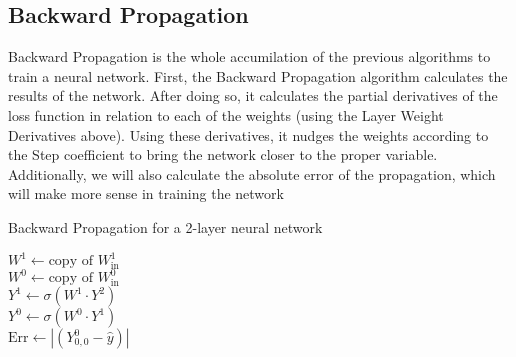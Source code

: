 \documentclass[10pt]{article}
\begin{document}
\subsection{Backward Propagation}
Backward Propagation is the whole accumilation of the previous algorithms to train a neural network. First, the Backward Propagation algorithm calculates the results of the network. After doing so, it calculates the partial derivatives of the loss function in relation to each of the weights (using the Layer Weight Derivatives above). Using these derivatives, it nudges the weights according to the Step coefficient to bring the network closer to the proper variable.\newline
Additionally, we will also calculate the absolute error of the propagation, which will make more sense in training the network\newline
\begin{algorithm}[H]
    \caption{Backward Propagation for a 2-layer neural network}
    $W^1 \gets \text{copy of } W^1_\text{in}$\\
    $W^0 \gets \text{copy of } W^0_\text{in}$\\
    $Y^1 \gets \sigma(W^1 \cdot Y^2)$\\
    $Y^0 \gets \sigma(W^0 \cdot Y^1)$\\
    $\text{Err} \gets | (Y^0_{0,0} - \hat{y}) |$\\
\end{algorithm}
\end{document}
